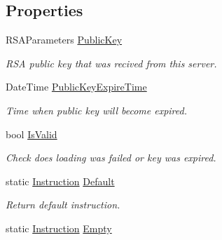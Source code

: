 \subsection*{Properties}
\begin{DoxyCompactItemize}
\item 
R\+S\+A\+Parameters \mbox{\hyperlink{class_pipes_provider_1_1_networking_1_1_routing_1_1_instruction_a8681a89ae14ad25d11ee0c588231b772}{Public\+Key}}
\begin{DoxyCompactList}\small\item\em R\+SA public key that was recived from this server. \end{DoxyCompactList}\item 
Date\+Time \mbox{\hyperlink{class_pipes_provider_1_1_networking_1_1_routing_1_1_instruction_a60281a347236a1311c37743b90596d58}{Public\+Key\+Expire\+Time}}
\begin{DoxyCompactList}\small\item\em Time when public key will become expired. \end{DoxyCompactList}\item 
bool \mbox{\hyperlink{class_pipes_provider_1_1_networking_1_1_routing_1_1_instruction_a07dbb5b97b3d9a28e5a318815d954278}{Is\+Valid}}
\begin{DoxyCompactList}\small\item\em Check does loading was failed or key was expired. \end{DoxyCompactList}\item 
static \mbox{\hyperlink{class_pipes_provider_1_1_networking_1_1_routing_1_1_instruction}{Instruction}} \mbox{\hyperlink{class_pipes_provider_1_1_networking_1_1_routing_1_1_instruction_a7b1790dc22b0fd1a11b447e207245e83}{Default}}
\begin{DoxyCompactList}\small\item\em Return default instruction. \end{DoxyCompactList}\item 
static \mbox{\hyperlink{class_pipes_provider_1_1_networking_1_1_routing_1_1_instruction}{Instruction}} \mbox{\hyperlink{class_pipes_provider_1_1_networking_1_1_routing_1_1_instruction_aad2d50b60ddcdd0c7d0671ced01a5480}{Empty}}

\end{DoxyCompactItemize}
